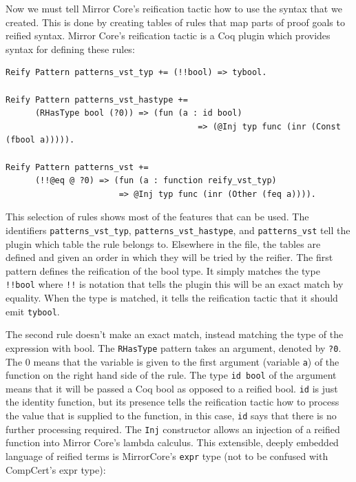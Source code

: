 \documentclass{puthesis}
\begin{document}
Now we must tell Mirror Core's reification tactic
\cite[section~4.4.1]{malecha:thesis} how to use the syntax that we
created. This is done by creating tables of rules that map parts of
proof goals to reified syntax. Mirror Core's reification tactic is a
Coq plugin which provides syntax for defining these rules:

\begin{lstlisting}
Reify Pattern patterns_vst_typ += (!!bool) => tybool.

Reify Pattern patterns_vst_hastype += 
      (RHasType bool (?0)) => (fun (a : id bool) 
                                       => (@Inj typ func (inr (Const (fbool a))))).

Reify Pattern patterns_vst += 
      (!!@eq @ ?0) => (fun (a : function reify_vst_typ) 
                       => @Inj typ func (inr (Other (feq a)))).
\end{lstlisting}

This selection of rules shows most of the features that can be
used. The identifiers \lstinline|patterns_vst_typ|,
\lstinline|patterns_vst_hastype|, and \lstinline|patterns_vst| tell the
plugin which table the rule belongs to. Elsewhere in the file, the
tables are defined and given an order in which they will be tried by
the reifier. The first pattern defines the reification of the bool
type. It simply matches the type \lstinline|!!bool| where
\lstinline|!!| is notation that tells the plugin this will be an exact
match by equality. When the type is matched, it tells the reification
tactic that it should emit \lstinline|tybool|.

The second rule doesn't make an exact match, instead matching the type
of the expression with bool. The \lstinline|RHasType| pattern takes an
argument, denoted by \lstinline|?0|. The 0 means that the variable is
given to the first argument (variable \lstinline|a|) of the function
on the right hand side of the rule. The type \lstinline|id bool| of
the argument means that it will be passed a Coq bool as opposed to a
reified bool. \lstinline|id| is just the identity function, but its
presence tells the reification tactic how to process the value that is
supplied to the function, in this case, \lstinline|id| says that there
is no further processing required.  The \lstinline|Inj| constructor
allows an injection of a reified function into Mirror Core's lambda
calculus. This extensible, deeply embedded language of reified terms
is MirrorCore's \lstinline{expr} type
(not to be confused with CompCert's expr type):
\end{document}
